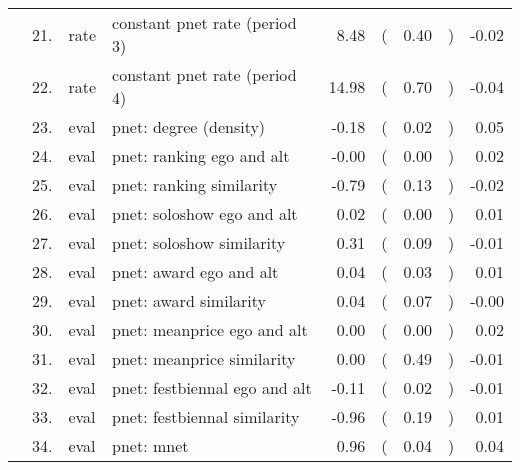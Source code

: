 \begin{table}[ht]
\begin{tabular}{llllrlrlr}
    & 21. & rate & constant pnet rate (period 3) & 8.48 & ( & 0.40 & ) & -0.02 \\ 
    & 22. & rate & constant pnet rate (period 4) & 14.98 & ( & 0.70 & ) & -0.04 \\ 
    & 23. & eval & pnet: degree (density) & -0.18 & ( & 0.02 & ) & 0.05 \\ 
    & 24. & eval & pnet: ranking ego and alt & -0.00 & ( & 0.00 & ) & 0.02 \\ 
    & 25. & eval & pnet: ranking similarity & -0.79 & ( & 0.13 & ) & -0.02 \\ 
    & 26. & eval & pnet: soloshow ego and alt & 0.02 & ( & 0.00 & ) & 0.01 \\ 
    & 27. & eval & pnet: soloshow similarity & 0.31 & ( & 0.09 & ) & -0.01 \\ 
    & 28. & eval & pnet: award ego and alt & 0.04 & ( & 0.03 & ) & 0.01 \\ 
    & 29. & eval & pnet: award similarity & 0.04 & ( & 0.07 & ) & -0.00 \\ 
    & 30. & eval & pnet: meanprice ego and alt & 0.00 & ( & 0.00 & ) & 0.02 \\ 
    & 31. & eval & pnet: meanprice similarity & 0.00 & ( & 0.49 & ) & -0.01 \\ 
    & 32. & eval & pnet: festbiennal ego and alt & -0.11 & ( & 0.02 & ) & -0.01 \\ 
    & 33. & eval & pnet: festbiennal similarity & -0.96 & ( & 0.19 & ) & 0.01 \\ 
    & 34. & eval & pnet: mnet & 0.96 & ( & 0.04 & ) & 0.04 \\ 
   \hline
\end{tabular}
\end{table}
